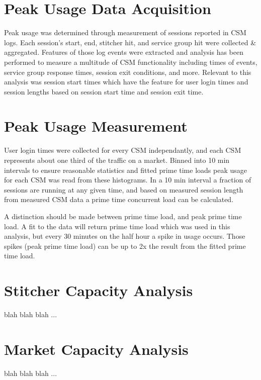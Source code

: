 \documentclass{article}
\begin{document}
\section{Peak Usage Data Acquisition}

Peak usage was determined through measurement of sessions reported in CSM logs. Each session's start, end, stitcher hit, and service group hit were collected \& aggregated. Features of those log events were extracted and analysis has been performed to measure a multitude of CSM functionality including times of events, service group response times, session exit conditions, and more. Relevant to this analysis was session start times which have the feature for user login times and session lengths based on session start time and session exit time. 

\section{Peak Usage Measurement}

User login times were collected for every CSM independantly, and each CSM represents about one third of the traffic on a market. Binned into 10 min intervals to ensure reasonable statistics and fitted prime time loads peak usage for each CSM was read from these histograms. In a 10 min interval a fraction of sessions are running at any given time, and based on measured session length from measured CSM data a prime time concurrent load can be calculated. 

A distinction should be made between prime time load, and peak prime time load. A fit to the data will return prime time load which was used in this analysis, but every 30 minutes on the half hour a spike in usage occurs. Those spikes (peak prime time load) can be up to 2x the result from the fitted prime time load.

 

\section{Stitcher Capacity Analysis}

blah blah blah ... 

\section{Market Capacity Analysis}

blah blah blah ... 
 

\newpage
\end{document}
